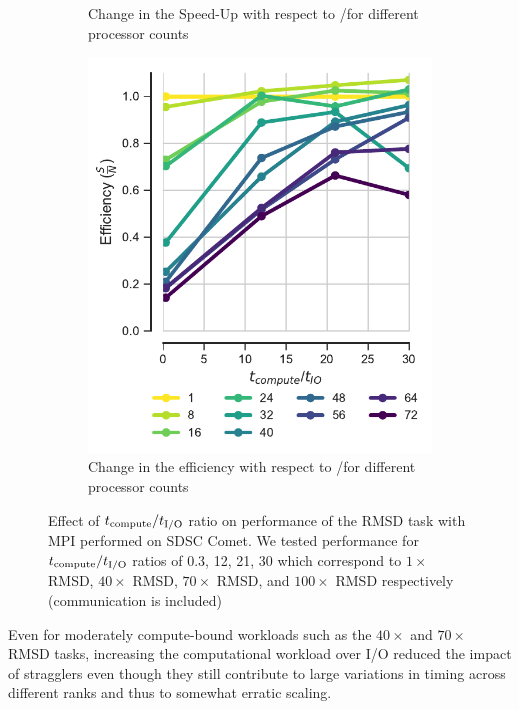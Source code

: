 \begin{figure}[ht!]
\begin{subfigure}{.3\textwidth}
  \caption{Change in the Speed-Up with respect to \tcomp/\tIO for different processor counts}
  \label{fig:S2_tcomp_tIO_effect}
\end{subfigure}
\hfill
\begin{subfigure}{.3\textwidth}
  \includegraphics[width=\linewidth]{figures/Compute_to_IO_ratio_on_performance_2d_3_v17.pdf}
  \caption{Change in the efficiency with respect to \tcomp/\tIO for different processor counts}
  \label{fig:E_tcomp_tIO_effect}
\end{subfigure}
%
\caption{Effect of ${t}_{\text{compute}}/{t}_{\text{I/O}}$ ratio on performance of the RMSD task with MPI performed on SDSC Comet. We tested performance for ${t}_{\text{compute}}/{t}_{\text{I/O}}$ ratios of 0.3, 12, 21, 30
which correspond to $1\times$ RMSD, $40\times$ RMSD, $70\times$ RMSD, and $100\times$ RMSD respectively (communication is included)}
\label{fig:tcomp_tIO_effect}
\end{figure}

Even for moderately compute-bound workloads such
as the $40\times$ and $70\times$ RMSD tasks, increasing the computational workload over I/O reduced the impact of stragglers even
though they still contribute to large variations in timing across different ranks and thus to somewhat erratic scaling.

